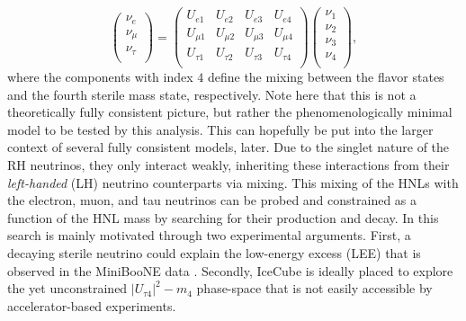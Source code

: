 \begin{equation}
    \label{eq:3_by_4_mixing_matrix}
    \begin{pmatrix}
    \nu_{e}\\
    \nu_{\mu}\\
    \nu_{\tau}\\
    \end{pmatrix}
    =
    \begin{pmatrix}
    U_{e1} & U_{e2} & U_{e3} & U_{e4}\\
    U_{\mu1} & U_{\mu2} & U_{\mu3} & U_{\mu4}\\
    U_{\tau1} & U_{\tau2} & U_{\tau3} & U_{\tau4}\\
    \end{pmatrix}
    \begin{pmatrix}
    \nu_{1}\\
    \nu_{2}\\
    \nu_{3}\\
    \nu_{4}\\
    \end{pmatrix},
\end{equation}
where the components with index $4$ define the mixing between the flavor states and the fourth sterile mass state, respectively. Note here that this is not a theoretically fully consistent picture, but rather the phenomenologically minimal model to be tested by this analysis. This can hopefully be put into the larger context of several fully consistent models, later. Due to the singlet nature of the RH neutrinos, they only interact weakly, inheriting these interactions from their \textit{left-handed} (LH) neutrino counterparts via mixing. This mixing of the HNLs with the electron, muon, and tau neutrinos can be probed and constrained as a function of the HNL mass by searching for their production and decay. In \cite{Coloma_2017, Coloma_2019} this search is mainly motivated through two experimental arguments. First, a decaying sterile neutrino could explain the low-energy excess (LEE) that is observed in the MiniBooNE data \cite{PhysRevLett.110.161801}. Secondly, IceCube is ideally placed to explore the yet unconstrained $|U_{\tau4}|^{2}-m_{4}$ phase-space that is not easily accessible by accelerator-based experiments.


